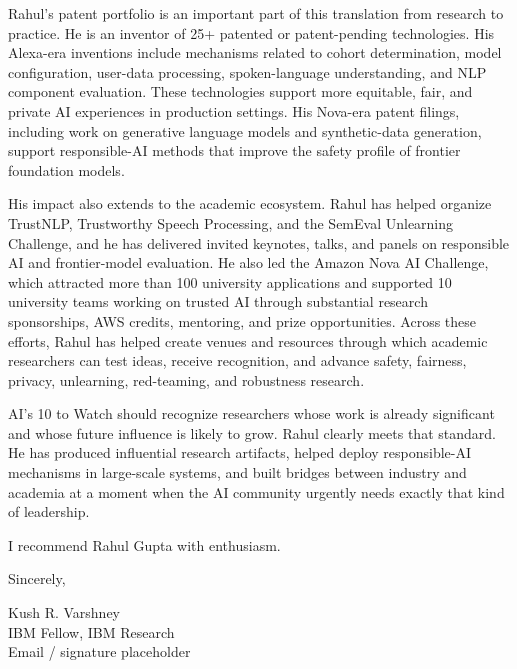 \documentclass[11pt]{article}
\begin{document}
Rahul's patent portfolio is an important part of this translation from research to practice. He is an inventor of 25+ patented or patent-pending technologies. His Alexa-era inventions include mechanisms related to cohort determination, model configuration, user-data processing, spoken-language understanding, and NLP component evaluation. These technologies support more equitable, fair, and private AI experiences in production settings. His Nova-era patent filings, including work on generative language models and synthetic-data generation, support responsible-AI methods that improve the safety profile of frontier foundation models.

His impact also extends to the academic ecosystem. Rahul has helped organize TrustNLP, Trustworthy Speech Processing, and the SemEval Unlearning Challenge, and he has delivered invited keynotes, talks, and panels on responsible AI and frontier-model evaluation. He also led the Amazon Nova AI Challenge, which attracted more than 100 university applications and supported 10 university teams working on trusted AI through substantial research sponsorships, AWS credits, mentoring, and prize opportunities. Across these efforts, Rahul has helped create venues and resources through which academic researchers can test ideas, receive recognition, and advance safety, fairness, privacy, unlearning, red-teaming, and robustness research.

AI's 10 to Watch should recognize researchers whose work is already significant and whose future influence is likely to grow. Rahul clearly meets that standard. He has produced influential research artifacts, helped deploy responsible-AI mechanisms in large-scale systems, and built bridges between industry and academia at a moment when the AI community urgently needs exactly that kind of leadership.

I recommend Rahul Gupta with enthusiasm.

Sincerely,

Kush R. Varshney\\
IBM Fellow, IBM Research\\
Email / signature placeholder
\end{document}
